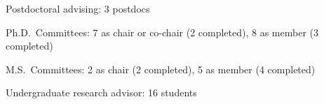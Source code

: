 \begin{veryTightItemize}
    \item Postdoctoral advising: 3 postdocs
    \item Ph.D.\ Committees: 7 as chair or co-chair (2 completed), 8 as member (3 completed)
    \item M.S.\ Committees:  2 as chair (2 completed), 5 as member (4 completed)
    \item Undergraduate research advisor: 16 students
\end{veryTightItemize}
